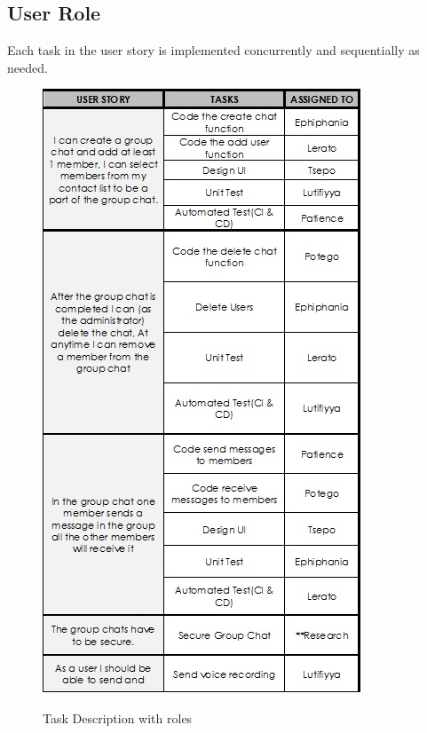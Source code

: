\documentclass[a4paper]{article}
\begin{document}
\subsection{User Role}
Each task in the user story is implemented concurrently and sequentially as needed.
\begin{figure}[H]
\includegraphics[width=0.8\linewidth]{./pictures/role.jpg}\\
\caption{\label{fig:Task Discription with roles}Task Description with roles}
\end{figure}
\end{document}
